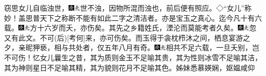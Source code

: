 窃思女儿自临浊世，{\includegraphics[width=3mm]{../Images/00004}\includegraphics[width=3mm]{../Images/00012}\footnotesize \kaishu 世不浊，因物所混而浊也，前后便有照应。◇``女儿''称妙！盖思普天下之称断不能有如此二字之清洁者。亦是宝玉之真心。}迄今凡十有六载。{\includegraphics[width=3mm]{../Images/00004}\includegraphics[width=3mm]{../Images/00012}\footnotesize \kaishu 方十六岁而夭，亦伤矣。}其先之乡籍姓氏，湮沦而莫能考者久矣。{\includegraphics[width=3mm]{../Images/00004}\includegraphics[width=3mm]{../Images/00012}\footnotesize \kaishu 忽又有此文。不可{(后)}{[}考何{]}来，亦可伤矣。}而玉得于衾枕栉沐之间，栖息宴游之夕，亲昵狎亵，相与共处者，仅五年八月有奇。{\includegraphics[width=3mm]{../Images/00004}\includegraphics[width=3mm]{../Images/00012}\footnotesize \kaishu 相共不足六载，一旦夭别，岂不可伤！}忆女儿曩生之昔，其为质则金玉不足喻其贵，其为性则冰雪不足喻其洁，其为神则星日不足喻其精，其为貌则花月不足喻其色。姊妹悉慕媖娴，妪媪咸仰